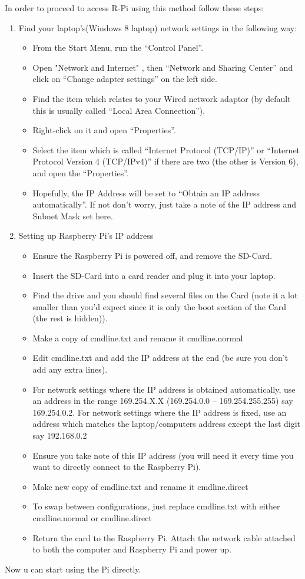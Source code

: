 \documentclass[11pt,a4paper]{article}
\begin{document}
		In order to proceed to access R-Pi using this method follow these steps:
		\begin{enumerate}
			\item Find your laptop's(Windows 8 laptop) network settings in the following way:
			\begin{itemize}
				\item From the Start Menu, run the “Control Panel”.
				\item Open "Network and Internet" , then “Network and Sharing Center” and click on “Change adapter settings” on the left side.
				\item Find the item which relates to your Wired network adaptor (by default this is usually called “Local Area Connection”).
				\item Right-click on it and open “Properties”.
				\item Select the item which is called “Internet Protocol (TCP/IP)” or “Internet Protocol Version 4 (TCP/IPv4)” if there are two (the other is Version 6), and open the “Properties”.
				\item Hopefully, the IP Address will be set to “Obtain an IP address automatically”.  If not don’t worry, just take a note of the IP address and Subnet Mask set here.
			\end{itemize}
			\item Setting up Raspberry Pi's IP address
			\begin{itemize}
				\item Ensure the Raspberry Pi is powered off, and remove the SD-Card.
				\item Insert the SD-Card into a card reader and plug it into your laptop.
				\item Find the drive and you should find several files on the Card (note it a lot smaller than you’d expect since it is only the boot section of the Card (the rest is hidden)).
				\item Make a copy of cmdline.txt and rename it cmdline.normal
				\item Edit cmdline.txt and add the IP address at the end (be sure you don’t add any extra lines).
				\item For network settings where the IP address is obtained automatically, use an address in the range 169.254.X.X (169.254.0.0 – 169.254.255.255) say 169.254.0.2.
				For network settings where the IP address is fixed, use an address which matches the laptop/computers address except the last digit say 192.168.0.2
				\item Ensure you take note of this IP address (you will need it every time you want to directly connect to the Raspberry Pi).
				\item Make new copy of cmdline.txt and rename it cmdline.direct
				\item To swap between configurations, just replace cmdline.txt with either cmdline.normal or cmdline.direct 
				\item Return the card to the Raspberry Pi. Attach the network cable attached to both the computer and Raspberry Pi and power up.
			\end{itemize}
		\end{enumerate}
		Now u can start using the Pi directly.	
	    
\end{document}
